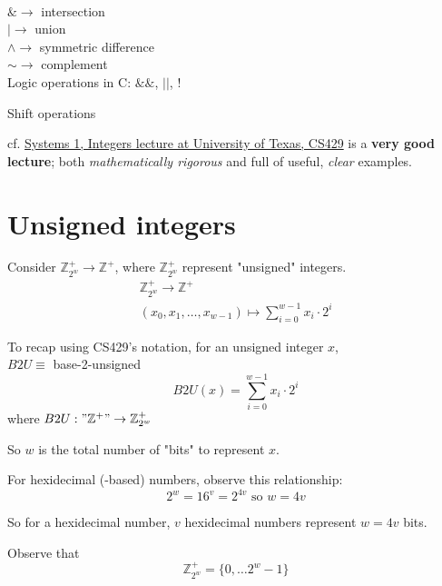 \documentclass[10pt]{amsart}
\begin{document}
\begin{multicols*}{2}
\qquad \\
$\& \to $ intersection \\
$| \to $ union \\
$\wedge \to $ symmetric difference \\
$\sim \to $ complement
\qquad \\

Logic operations in C: $\& \&$, $||$, $!$ 

Shift operations



cf. \href{https://www.cs.utexas.edu/users/fussell/courses/cs429h/lectures/Lecture_3-429h.pdf}{Systems 1, Integers lecture at University of Texas, CS429} is a \textbf{very good lecture}; both \emph{mathematically rigorous} and full of useful, \emph{clear} examples.

\section{Unsigned integers}

Consider $\mathbb{Z}^+_{2^w} \to \mathbb{Z}^+$, where $\mathbb{Z}^+_{2^w}$ represent "unsigned" integers. 
\begin{equation}
\begin{gathered}
\mathbb{Z}^+_{2^w} \to \mathbb{Z}^+ \\ 
(x_0, x_1 , \dots , x_{w-1}) \mapsto \sum_{i=0}^{w-1} x_i \cdot 2^i 
\end{gathered}
\end{equation}

To recap using CS429's notation, for an unsigned integer $x$, \\
$B2U \equiv $ base-2-unsigned \\
\[
B2U(x) = \sum_{i=0}^{w-1} x_i \cdot 2^i 
\]
where $B2U : "\mathbb{Z}^+" \to \mathbb{Z}^+_{2^w}$

So $w$ is the total number of "bits" to represent $x$.


For hexidecimal (-based) numbers, observe this relationship: 
\begin{equation}
2^w = 16^v = 2^{4v} \text{ so } w =4v
\end{equation}

So for a hexidecimal number, $v$ hexidecimal numbers represent $w=4v$ bits. 

Observe that 
\begin{equation}
\mathbb{Z}^+_{2^w} = \lbrace 0 , \dots 2^w - 1 \rbrace 
\end{equation}


\end{multicols*}
\end{document}
